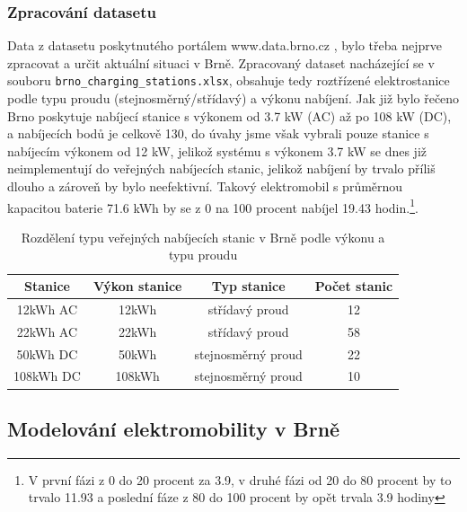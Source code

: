 \documentclass[a4paper,11pt]{article}
\begin{document}
\subsubsection{Zpracování datasetu}
Data z datasetu poskytnutého portálem www.data.brno.cz \cite{data_brno}, bylo třeba nejprve zpracovat a určit 
aktuální situaci v Brně. Zpracovaný dataset nacházející se v souboru \texttt{brno\_charging\_stations.xlsx},
obsahuje tedy roztřízené elektrostanice podle typu proudu (stejnosměrný/střídavý) a výkonu nabíjení. Jak již bylo
řečeno Brno poskytuje nabíjecí stanice s výkonem od 3.7 kW (AC) až po 108 kW (DC), a nabíjecích bodů je celkově 130,
do úvahy jsme však vybrali pouze stanice s nabíjecím výkonem od 12 kW, jelikož systému s výkonem 3.7 kW se dnes již 
neimplementují do veřejných nabíjecích stanic, jelikož nabíjení by trvalo příliš dlouho a zároveň by bylo neefektivní.
Takový elektromobil s průměrnou kapacitou baterie 71.6 kWh by se z 0 na 100 procent nabíjel 19.43 hodin.\footnote{V první fázi 
z 0 do 20 procent za 3.9, v druhé fázi od 20 do 80 procent by to trvalo 11.93 a poslední fáze z 80 do 100 procent by opět trvala 3.9 hodiny}.

\begin{table}[h!]
    \centering
    \vspace{0.5cm} %
    \begin{tabular}{|c|c|c|c|}
        \hline
        \textbf{Stanice} & \textbf{Výkon stanice} & \textbf{Typ stanice} & \textbf{Počet stanic}\\
        \hline
        12kWh  AC &  12kWh   & střídavý proud       & 12  \\
        \hline
        22kWh  AC &  22kWh   & střídavý proud       & 58  \\
        \hline
        50kWh  DC &  50kWh   & stejnosměrný proud   & 22  \\
        \hline
        108kWh DC &  108kWh  & stejnosměrný proud   & 10  \\
        \hline
    \end{tabular}
    \caption{Rozdělení typu veřejných nabíjecích stanic v Brně podle výkonu a typu proudu}
    \label{table:charging-stations-distribution}
    \vspace{0.5cm} %
\end{table}


\subsection{Modelování elektromobility v Brně}
\end{document}

